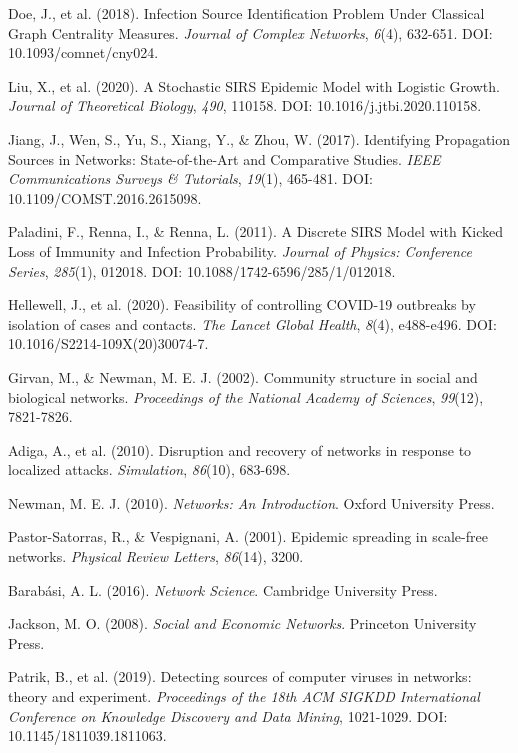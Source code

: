 \begin{thebibliography}{99}
Doe, J., et al. (2018). Infection Source Identification Problem Under Classical Graph Centrality Measures. \textit{Journal of Complex Networks}, \textit{6}(4), 632-651. DOI: 10.1093/comnet/cny024.

Liu, X., et al. (2020). A Stochastic SIRS Epidemic Model with Logistic Growth. \textit{Journal of Theoretical Biology}, \textit{490}, 110158. DOI: 10.1016/j.jtbi.2020.110158.

Jiang, J., Wen, S., Yu, S., Xiang, Y., \& Zhou, W. (2017). Identifying Propagation Sources in Networks: State-of-the-Art and Comparative Studies. \textit{IEEE Communications Surveys \& Tutorials}, \textit{19}(1), 465-481. DOI: 10.1109/COMST.2016.2615098.

Paladini, F., Renna, I., \& Renna, L. (2011). A Discrete SIRS Model with Kicked Loss of Immunity and Infection Probability. \textit{Journal of Physics: Conference Series}, \textit{285}(1), 012018. DOI: 10.1088/1742-6596/285/1/012018.

Hellewell, J., et al. (2020). Feasibility of controlling COVID-19 outbreaks by isolation of cases and contacts. \textit{The Lancet Global Health}, \textit{8}(4), e488-e496. DOI: 10.1016/S2214-109X(20)30074-7.

Girvan, M., \& Newman, M. E. J. (2002). Community structure in social and biological networks. \textit{Proceedings of the National Academy of Sciences}, \textit{99}(12), 7821-7826.

Adiga, A., et al. (2010). Disruption and recovery of networks in response to localized attacks. \textit{Simulation}, \textit{86}(10), 683-698.

Newman, M. E. J. (2010). \textit{Networks: An Introduction}. Oxford University Press.

Pastor-Satorras, R., \& Vespignani, A. (2001). Epidemic spreading in scale-free networks. \textit{Physical Review Letters}, \textit{86}(14), 3200.

Barabási, A. L. (2016). \textit{Network Science}. Cambridge University Press.

Jackson, M. O. (2008). \textit{Social and Economic Networks}. Princeton University Press.

Patrik, B., et al. (2019). Detecting sources of computer viruses in networks: theory and experiment. \textit{Proceedings of the 18th ACM SIGKDD International Conference on Knowledge Discovery and Data Mining}, 1021-1029. DOI: 10.1145/1811039.1811063.


\end{thebibliography}
